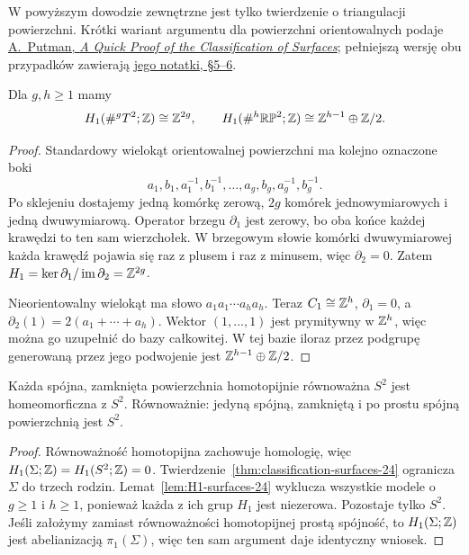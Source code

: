 W powyższym dowodzie zewnętrzne jest tylko
twierdzenie o triangulacji powierzchni.
Krótki wariant argumentu dla powierzchni
orientowalnych podaje
\href{https://academicweb.nd.edu/~andyp/notes/ClassificationSurfaces.pdf}
{A.\ Putman, \emph{A Quick Proof of the Classification of Surfaces}};
pełniejszą wersję obu przypadków zawierają
\href{https://academicweb.nd.edu/~andyp/notes/ClassificationSurfacesLong.pdf}
{jego notatki, §5--6}.

\begin{lemat}
\label{lem:H1-surfaces-24}
Dla $g,h\geq1$ mamy
\[
 H_1(\#^g T^2;\mathbb{Z})\cong\mathbb{Z}^{2g},
 \qquad
 H_1(\#^h\mathbb{RP}^2;\mathbb{Z})
     \cong\mathbb{Z}^{h-1}\oplus\mathbb{Z}/2.
\]
\end{lemat}
\begin{proof}
Standardowy wielokąt orientowalnej
powierzchni ma kolejno oznaczone boki
\[
a_1,b_1,a_1^{-1},b_1^{-1},\ldots,
a_g,b_g,a_g^{-1},b_g^{-1}.
\]
Po sklejeniu dostajemy jedną komórkę
zerową, $2g$ komórek jednowymiarowych
i jedną dwuwymiarową. Operator brzegu
$\partial_1$ jest zerowy, bo oba końce
każdej krawędzi to ten sam wierzchołek.
W brzegowym słowie komórki dwuwymiarowej
każda krawędź pojawia się raz z plusem
i raz z minusem, więc $\partial_2=0$.
Zatem $H_1=\ker\partial_1/
\operatorname{im}\partial_2=\mathbb{Z}^{2g}$.

Nieorientowalny wielokąt ma słowo
$a_1a_1\cdots a_ha_h$. Teraz
$C_1\cong\mathbb{Z}^h$, $\partial_1=0$,
a $\partial_2(1)=2(a_1+\cdots+a_h)$.
Wektor $(1,\ldots,1)$ jest prymitywny
w $\mathbb{Z}^h$, więc można go uzupełnić do
bazy całkowitej. W tej bazie iloraz
przez podgrupę generowaną przez jego
podwojenie jest
$\mathbb{Z}^{h-1}\oplus\mathbb{Z}/2$.
\end{proof}

\begin{twierdzenie}
\label{thm:poincare-2-24}
Każda spójna, zamknięta powierzchnia
homotopijnie równoważna $S^2$
jest homeomorficzna z $S^2$.
Równoważnie: jedyną spójną, zamkniętą
i po prostu spójną powierzchnią
jest $S^2$.
\end{twierdzenie}
\begin{proof}
Równoważność homotopijna zachowuje
homologię, więc $H_1(\Sigma;\mathbb{Z})=
H_1(S^2;\mathbb{Z})=0$.
Twierdzenie~\ref{thm:classification-surfaces-24}
ogranicza $\Sigma$ do trzech rodzin.
Lemat~\ref{lem:H1-surfaces-24}
wyklucza wszystkie modele o $g\geq1$
i $h\geq1$, ponieważ każda z ich
grup $H_1$ jest niezerowa.
Pozostaje tylko $S^2$.
Jeśli założymy zamiast równoważności
homotopijnej prostą spójność, to
$H_1(\Sigma;\mathbb{Z})$ jest abelianizacją
$\pi_1(\Sigma)$, więc ten sam argument
daje identyczny wniosek.
\end{proof}


